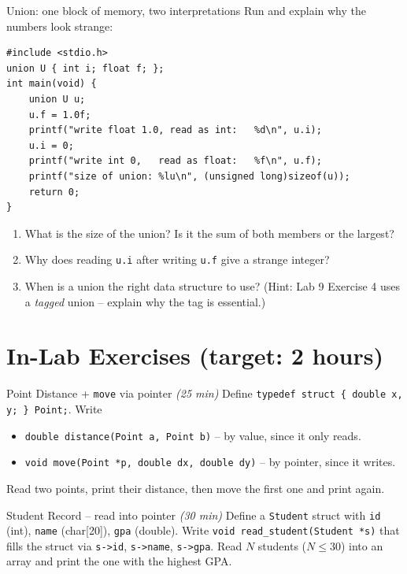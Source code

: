 \documentclass[11pt]{article}
\begin{document}
\begin{tryit}{Union: one block of memory, two interpretations}
Run and explain why the numbers look strange:
\begin{lstlisting}
#include <stdio.h>
union U { int i; float f; };
int main(void) {
    union U u;
    u.f = 1.0f;
    printf("write float 1.0, read as int:   %d\n", u.i);
    u.i = 0;
    printf("write int 0,   read as float:   %f\n", u.f);
    printf("size of union: %lu\n", (unsigned long)sizeof(u));
    return 0;
}
\end{lstlisting}
\begin{enumerate}[nosep,leftmargin=*]
  \item What is the size of the union? Is it the sum of both members or the largest?
  \item Why does reading \texttt{u.i} after writing \texttt{u.f} give a strange integer?
  \item When is a union the right data structure to use?
        (Hint: Lab 9 Exercise 4 uses a \emph{tagged} union -- explain why the tag is essential.)
\end{enumerate}
\end{tryit}

\section*{In-Lab Exercises (target: 2 hours)}

\begin{labexercise}{Point Distance + \texttt{move} via pointer \hfill {\small \itshape (25 min)}}
Define \texttt{typedef struct \{ double x, y; \} Point;}. Write
\begin{itemize}[leftmargin=*,nosep]
  \item \texttt{double distance(Point a, Point b)} -- by value, since it only reads.
  \item \texttt{void move(Point *p, double dx, double dy)} -- by pointer, since it writes.
\end{itemize}
Read two points, print their distance, then move the first one and print again.
\end{labexercise}

\begin{labexercise}{Student Record -- read into pointer \hfill {\small \itshape (30 min)}}
Define a \texttt{Student} struct with \texttt{id} (int), \texttt{name} (char[20]),
\texttt{gpa} (double). Write \texttt{void read\_student(Student *s)} that fills the
struct via \texttt{s->id}, \texttt{s->name}, \texttt{s->gpa}. Read $N$ students
($N \leq 30$) into an array and print the one with the highest GPA.
\end{labexercise}
\end{document}

